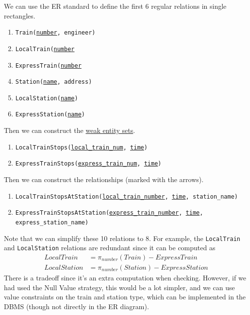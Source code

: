 \begin{example}
    We can use the ER standard to define the first 6 regular relations in single rectangles.  
    \begin{enumerate}
      \item \texttt{Train(\underline{number}, engineer)}
      \item \texttt{LocalTrain(\underline{number}}
      \item \texttt{ExpressTrain(\underline{number}}
      \item \texttt{Station(\underline{name}, address)}
      \item \texttt{LocalStation(\underline{name})}
      \item \texttt{ExpressStation(\underline{name})}
    \end{enumerate}
    Then we can construct the \hyperref[def:weak-entity-set]{weak entity sets}. 
    \begin{enumerate}
      \item \texttt{LocalTrainStops(\underline{local\_train\_num}, \underline{time})}
      \item \texttt{ExpressTrainStops(\underline{express\_train\_num}, \underline{time})}
    \end{enumerate}
    Then we can construct the relationships (marked with the arrows).  
    \begin{enumerate}
      \item \texttt{LocalTrainStopsAtStation(\underline{local\_train\_number}, \underline{time}, station\_name)}
      \item \texttt{ExpressTrainStopsAtStation(\underline{express\_train\_number}, \underline{time}, express\_station\_name)}
    \end{enumerate}
    Note that we can simplify these 10 relations to 8. For example, the \texttt{LocalTrain} and \texttt{LocalStation} relations are redundant since it can be computed as 
    \begin{align}
      LocalTrain & = \pi_{number} (Train) - ExpressTrain \\
      LocalStation & = \pi_{number} (Station) - ExpressStation
    \end{align}
    There is a tradeoff since it's an extra computation when checking. However, if we had used the Null Value strategy, this would be a lot simpler, and we can use value constraints on the train and station type, which can be implemented in the DBMS (though not directly in the ER diagram). 
  \end{example}

